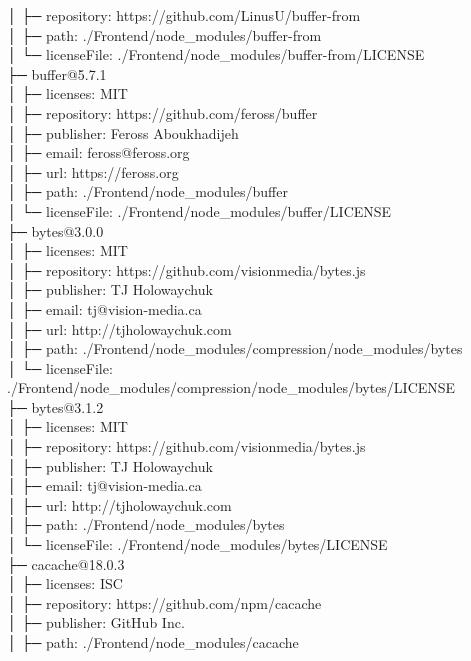 │  ├─ repository: https://github.com/LinusU/buffer-from\\
│  ├─ path: ./Frontend/node\_modules/buffer-from\\
│  └─ licenseFile: ./Frontend/node\_modules/buffer-from/LICENSE\\
├─ buffer@5.7.1\\
│  ├─ licenses: MIT\\
│  ├─ repository: https://github.com/feross/buffer\\
│  ├─ publisher: Feross Aboukhadijeh\\
│  ├─ email: feross@feross.org\\
│  ├─ url: https://feross.org\\
│  ├─ path: ./Frontend/node\_modules/buffer\\
│  └─ licenseFile: ./Frontend/node\_modules/buffer/LICENSE\\
├─ bytes@3.0.0\\
│  ├─ licenses: MIT\\
│  ├─ repository: https://github.com/visionmedia/bytes.js\\
│  ├─ publisher: TJ Holowaychuk\\
│  ├─ email: tj@vision-media.ca\\
│  ├─ url: http://tjholowaychuk.com\\
│  ├─ path: ./Frontend/node\_modules/compression/node\_modules/bytes\\
│  └─ licenseFile: ./Frontend/node\_modules/compression/node\_modules/bytes/LICENSE\\
├─ bytes@3.1.2\\
│  ├─ licenses: MIT\\
│  ├─ repository: https://github.com/visionmedia/bytes.js\\
│  ├─ publisher: TJ Holowaychuk\\
│  ├─ email: tj@vision-media.ca\\
│  ├─ url: http://tjholowaychuk.com\\
│  ├─ path: ./Frontend/node\_modules/bytes\\
│  └─ licenseFile: ./Frontend/node\_modules/bytes/LICENSE\\
├─ cacache@18.0.3\\
│  ├─ licenses: ISC\\
│  ├─ repository: https://github.com/npm/cacache\\
│  ├─ publisher: GitHub Inc.\\
│  ├─ path: ./Frontend/node\_modules/cacache\\
